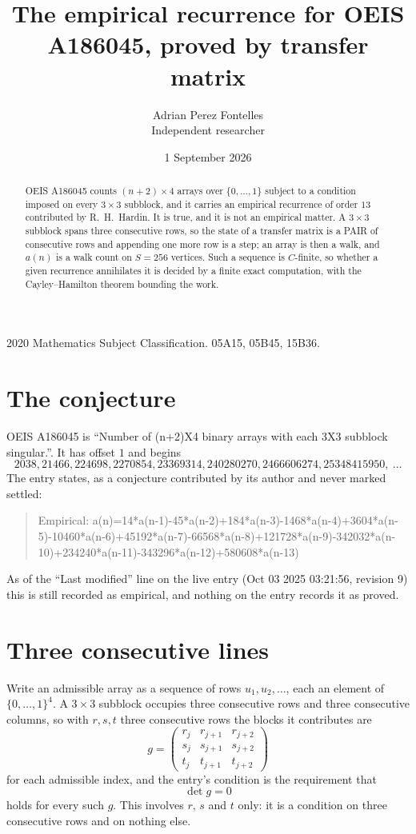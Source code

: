 \documentclass[11pt,a4paper]{article}
\title{The empirical recurrence for OEIS A186045, proved by transfer matrix}
\author{Adrian Perez Fontelles\\ \small Independent researcher}
\date{1 September 2026}
\theoremstyle{plain}
\theoremstyle{definition}
\begin{document}
\maketitle

\begin{abstract}
OEIS A186045 counts $(n+2)\times4$ arrays over $\{0,\dots,1\}$ subject to a condition imposed on
every $3\times3$ subblock, and it carries an empirical recurrence of order $13$
contributed by R.~H.~Hardin. It is true, and it is not an empirical matter. A $3\times3$
subblock spans three consecutive rows, so the state of a transfer matrix is a PAIR of
consecutive rows and appending one more row is a step; an array is then a walk, and
$a(n)$ is a walk count on $S=256$ vertices. Such a sequence is $C$-finite, so whether a given
recurrence annihilates it is decided by a finite exact computation, with the Cayley--Hamilton
theorem bounding the work.
\end{abstract}

\noindent\small 2020 Mathematics Subject Classification. 05A15, 05B45, 15B36.\normalsize

\section{The conjecture}

OEIS A186045 is ``Number of (n+2)X4 binary arrays with each 3X3 subblock singular.''. It has offset $1$ and begins
\[
2038, 21466, 224698, 2270854, 23369314, 240280270, 2466606274, 25348415950,\ \dots
\]
The entry states, as a conjecture contributed by its author and never marked settled:
\begin{quote}
Empirical: a(n)=14*a(n-1)-45*a(n-2)+184*a(n-3)-1468*a(n-4)+3604*a(n-5)-10460*a(n-6)+45192*a(n-7)-66568*a(n-8)+121728*a(n-9)-342032*a(n-10)+234240*a(n-11)-343296*a(n-12)+580608*a(n-13)
\end{quote}
As of the ``Last modified'' line on the live entry (Oct 03 2025 03:21:56, revision 9) this is still
recorded as empirical, and nothing on the entry records it as proved.

\section{Three consecutive lines}

Write an admissible array as a sequence of rows $u_1,u_2,\dots$, each an element of
$\{0,\dots,1\}^{4}$. A $3\times3$ subblock occupies three consecutive rows and
three consecutive columns, so with $r,s,t$ three consecutive rows the blocks it
contributes are
\[
g=\begin{pmatrix}r_j&r_{j+1}&r_{j+2}\\ s_j&s_{j+1}&s_{j+2}\\ t_j&t_{j+1}&t_{j+2}\end{pmatrix}
\]
for each admissible index, and the entry's condition is the requirement that
\[
\det g = 0
\]
holds for every such $g$. This involves $r$, $s$ and $t$ only: it is a condition on
three consecutive rows and on nothing else.
\end{document}
